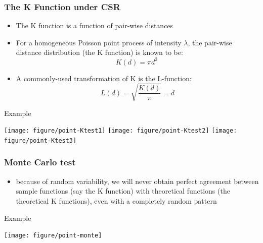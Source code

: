 \documentclass[10pt]{beamer}\usepackage[]{graphicx}\usepackage[]{color}
\newenvironment{knitrout}{}{} %
\newcommand{\bitemize}{\begin{itemize}}
\newcommand{\eitemize}{\end{itemize}}
\newcommand{\bblock}{\begin{block}}
\newcommand{\eblock}{\end{block}}
\begin{document}
\begin{frame}
\frametitle{The K Function under CSR}

\bitemize
\item The K function is a function of pair-wise distances
\item For a homogeneous Poisson point process of intensity $\lambda$, the pair-wise distance distribution (the K function) is known to be:
\[
K(d) = \pi d^2\
\]
\item A commonly-used transformation of K is the L-function:
\[
L(d) = \sqrt{\frac{K(d)}{\pi}} = d
\]
\eitemize

\bblock{Example}
\begin{knitrout}
\color{fgcolor}

{\centering \texttt{[image: figure/point-Ktest1]} 
\texttt{[image: figure/point-Ktest2]} 
\texttt{[image: figure/point-Ktest3]} 

}



\end{knitrout}

\eblock

\end{frame}

\begin{frame}
\frametitle{Monte Carlo test}

\bitemize 
\item because of random variability, we will never obtain perfect
agreement between sample functions (say the K function) with theoretical
functions (the theoretical K functions), even with a completely random pattern
\eitemize

\bblock{Example}
\begin{knitrout}
\color{fgcolor}

{\centering \texttt{[image: figure/point-monte]} 

}



\end{knitrout}

\eblock
\end{frame}
\end{document}

